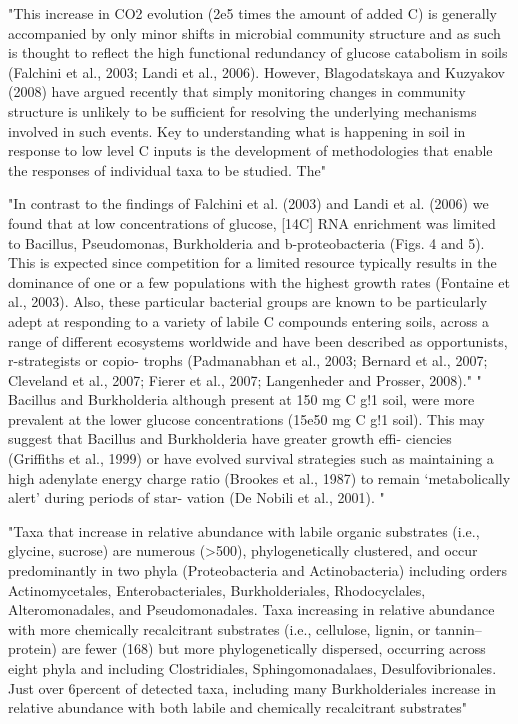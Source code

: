 "This increase in CO2 evolution (2e5 times the amount of added C) is generally accompanied by only minor shifts in microbial community structure and as such is thought to reflect the high functional redundancy of glucose catabolism in soils (Falchini et al., 2003; Landi et al., 2006). However, Blagodatskaya and Kuzyakov (2008) have argued recently that simply monitoring changes in community structure is unlikely to be sufficient for resolving the underlying mechanisms involved in such events. Key to understanding what is happening in soil in response to low level C inputs is the development of methodologies that enable the responses of individual taxa to be studied. The" \cite{Jenkins_2010}

"In contrast to the findings of Falchini et al. (2003) and Landi et al. (2006) we found that at low concentrations of glucose, [14C] RNA enrichment was limited to Bacillus, Pseudomonas, Burkholderia and b-proteobacteria (Figs. 4 and 5). This is expected since competition for a limited resource typically results in the dominance of one or a few populations with the highest growth rates (Fontaine et al., 2003). Also, these particular bacterial groups are known to be particularly adept at responding to a variety of labile C compounds entering soils, across a range of different ecosystems worldwide and have been described as opportunists, r-strategists or copio- trophs (Padmanabhan et al., 2003; Bernard et al., 2007; Cleveland et al., 2007; Fierer et al., 2007; Langenheder and Prosser, 2008)." " Bacillus and Burkholderia although present at 150 mg C g!1 soil, were more prevalent at the lower glucose concentrations (15e50 mg C g!1 soil). This may suggest that Bacillus and Burkholderia have greater growth effi- ciencies (Griffiths et al., 1999) or have evolved survival strategies such as maintaining a high adenylate energy charge ratio (Brookes et al., 1987) to remain ‘metabolically alert’ during periods of star- vation (De Nobili et al., 2001). "\cite{Jenkins_2010}

"Taxa that increase in relative abundance with labile organic substrates (i.e., glycine, sucrose) are numerous (>500), phylogenetically clustered, and occur predominantly in two phyla (Proteobacteria and Actinobacteria) including orders Actinomycetales, Enterobacteriales, Burkholderiales, Rhodocyclales, Alteromonadales, and Pseudomonadales. Taxa increasing in relative abundance with more chemically recalcitrant substrates (i.e., cellulose, lignin, or tannin–protein) are fewer (168) but more phylogenetically dispersed, occurring across eight phyla and including Clostridiales, Sphingomonadalaes, Desulfovibrionales. Just over 6percent of detected taxa, including many Burkholderiales increase in relative abundance with both labile and chemically recalcitrant substrates" \cite{Goldfarb_2011}

